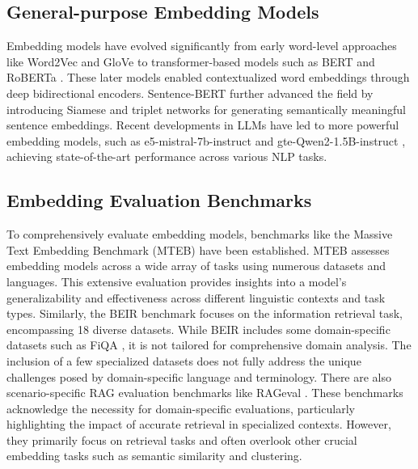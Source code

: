 \subsection{General-purpose Embedding Models}
Embedding models have evolved significantly from early word-level approaches like Word2Vec \citep{word2vector} and GloVe \citep{pennington-etal-2014-glove} to transformer-based models such as BERT \citep{Bert} and RoBERTa \citep{roberta}. These later models enabled contextualized word embeddings through deep bidirectional encoders. Sentence-BERT \citep{sentence-bert} further advanced the field by introducing Siamese and triplet networks for generating semantically meaningful sentence embeddings. Recent developments in LLMs have led to more powerful embedding models, such as e5-mistral-7b-instruct \citep{e5} and gte-Qwen2-1.5B-instruct \citep{qwen2}, achieving state-of-the-art performance across various NLP tasks.


\subsection{Embedding Evaluation Benchmarks}
To comprehensively evaluate embedding models, benchmarks like the Massive Text Embedding Benchmark (MTEB) \citep{mteb} have been established. MTEB assesses embedding models across a wide array of tasks using numerous datasets and languages. This extensive evaluation provides insights into a model's generalizability and effectiveness across different linguistic contexts and task types. Similarly, the BEIR benchmark \citep{beir} focuses on the information retrieval task, encompassing 18 diverse datasets. While BEIR includes some domain-specific datasets such as FiQA \citep{FiQA}, it is not tailored for comprehensive domain analysis. The inclusion of a few specialized datasets does not fully address the unique challenges posed by domain-specific language and terminology. There are also scenario-specific RAG evaluation benchmarks like RAGeval \citep{rageval}. These benchmarks acknowledge the necessity for domain-specific evaluations, particularly highlighting the impact of accurate retrieval in specialized contexts. However, they primarily focus on retrieval tasks and often overlook other crucial embedding tasks such as semantic similarity and clustering.

